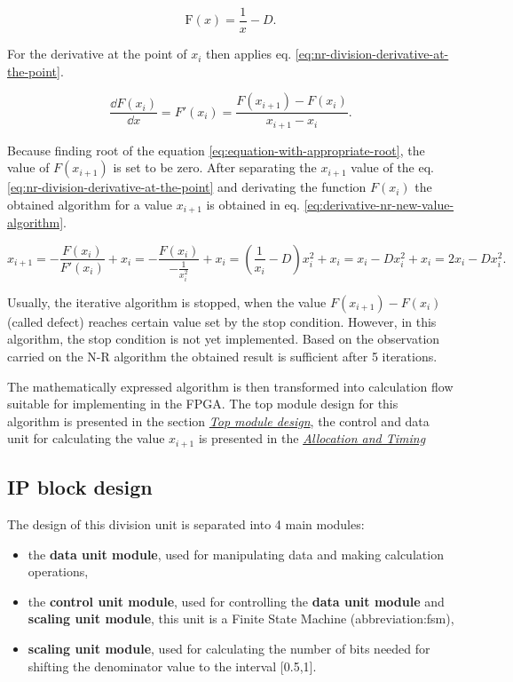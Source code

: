 \documentclass[a4paper, twoside, 11pt]{article}
\begin{document}
\begin{equation}\label{eq:equation-with-appropriate-root}
  \text{F} (x) = \frac{1}{x} - D.
\end{equation}

For the derivative at the point of $x_i$ then applies eq. \ref{eq:nr-division-derivative-at-the-point}.

\begin{equation}\label{eq:nr-division-derivative-at-the-point}
  \frac{\dd F(x_i)}{\dd x} = F'(x_i) = \frac{F (x_{i+1}) - F (x_i)}{x_{i+1}-x_i}.
\end{equation}

Because finding root of the equation \ref{eq:equation-with-appropriate-root}, the value of $F (x_{i+1})$ is set to be zero. After separating the $x_{i+1}$ value of the eq. \ref{eq:nr-division-derivative-at-the-point} and derivating the function $F (x_i)$ the obtained algorithm for a value $x_{i+1}$ is obtained in eq. \ref{eq:derivative-nr-new-value-algorithm}.\par

\begin{equation}\label{eq:derivative-nr-new-value-algorithm}
  x_{i+1} = -\frac{F (x_i)}{F' (x_i)} + x_i = - \frac{F (x_i)}{-\frac{1}{x_i^2}} + x_i = (\frac{1}{x_i} - D) x_i^2 + x_i = x_i - D x_i^2 + x_i = 2 x_i - D x_i^2.
\end{equation}

Usually, the iterative algorithm is stopped, when the value $F(x_{i+1}) - F(x_i)$ (called defect) reaches certain value set by the stop condition. However, in this algorithm, the stop condition is not yet implemented. Based on the observation carried on the N-R algorithm the obtained result is sufficient after 5 iterations.

The mathematically expressed algorithm is then transformed into calculation flow suitable for implementing in the FPGA. The top module design for this algorithm is presented in the section \hyperref[subsubsec:division-top-module-design]{\textit{Top module design}}, the control and data unit for calculating the value $x_{i+1}$ is presented in the \hyperref[subsubsec:division-allocation-and-timing]{\textit{Allocation and Timing}}

\subsection{IP block design}\label{subsec:division-ip-block-design}
The design of this division unit is separated into 4 main modules:
\begin{itemize}
  \item the \textbf{data unit module}, used for manipulating data and making calculation operations,
  \item the \textbf{control unit module}, used for controlling the \textbf{data unit module} and \textbf{scaling unit module}, this unit is a Finite State Machine (\gls{abbreviation:fsm}),
  \item \textbf{scaling unit module}, used for calculating the number of bits needed for shifting the denominator value to the interval [0.5,1].
\end{itemize}
\end{document}
